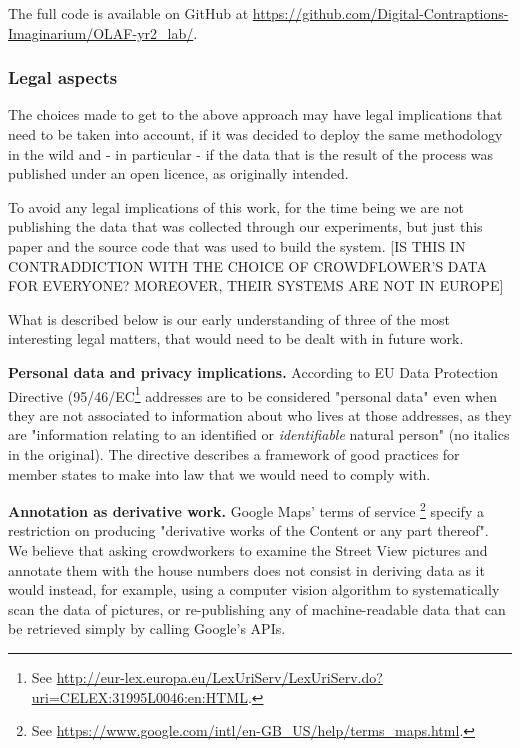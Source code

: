         The full code is available on GitHub at \url{https://github.com/Digital-Contraptions-Imaginarium/OLAF-yr2_lab/}.

    \subsubsection{Legal aspects}

    The choices made to get to the above approach may have legal implications that need to be taken into account, if it was decided to deploy the same methodology in the wild and - in particular - if the data that is the result of the process was published under an open licence, as originally intended. 
    
    To avoid any legal implications of this work, for the time being we are not publishing the data that was collected through our experiments, but just this paper and the source code that was used to build the system. [IS THIS IN CONTRADDICTION WITH THE CHOICE OF CROWDFLOWER'S DATA FOR EVERYONE? MOREOVER, THEIR SYSTEMS ARE NOT IN EUROPE]
    
    What is described below is our early understanding of three of the most interesting legal matters, that would need to be dealt with in future work. 

    \textbf{Personal data and privacy implications.} According to EU Data Protection Directive (95/46/EC\footnote{See \url{http://eur-lex.europa.eu/LexUriServ/LexUriServ.do?uri=CELEX:31995L0046:en:HTML}.} addresses are to be considered "personal data" even when they are not associated to information about who lives at those addresses, as they are "information relating to an identified or {\it identifiable} natural person" (no italics in the original). The directive describes a framework of good practices for member states to make into law that we would need to comply with.
    	
    \textbf{Annotation as derivative work.} Google Maps' terms of service \footnote{See \url{https://www.google.com/intl/en-GB_US/help/terms_maps.html}.} specify a restriction on producing "derivative works of the Content or any part thereof". We believe that asking crowdworkers to examine the Street View pictures and annotate them with the house numbers does not consist in deriving data as it would instead, for example, using a computer vision algorithm to systematically scan the data of pictures, or re-publishing any of machine-readable data that can be retrieved simply by calling Google's APIs. 
    
